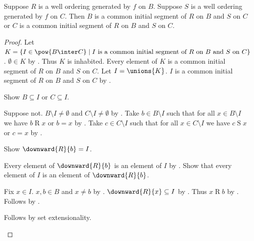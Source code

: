 \begin{lemma}\label{generated_well_orderings_compatible}
    Suppose $R$ is a well ordering generated by $f$ on $B$.
    Suppose $S$ is a well ordering generated by $f$ on $C$.
    Then $B$ is a common initial segment of $R$ on $B$ and $S$ on $C$
    or $C$ is a common initial segment of $R$ on $B$ and $S$ on $C$.
\end{lemma}
\begin{proof}
    Let $K = \{I\in\pow{B\inter C}\mid \text{$I$ is a common initial segment of $R$ on $B$ and $S$ on $C$}\}$.
    $\emptyset\in K$ by .
    Thus $K$ is inhabited.
    Every element of $K$ is a common initial segment of $R$ on $B$ and $S$ on $C$.
    Let $I = \unions{K}$.
    $I$ is a common initial segment of $R$ on $B$ and $S$ on $C$
        by .

    Show $B\subseteq I$ or $C\subseteq I$.
    \begin{subproof}
        Suppose not.
        $B\setminus I\neq\emptyset$ and $C\setminus I\neq\emptyset$
            by .
        Take $b\in B\setminus I$ such that for all $x\in B\setminus I$
            we have $b\mathrel{R}x$ or $b=x$ by .
        Take $c\in C\setminus I$ such that for all $x\in C\setminus I$
            we have $c\mathrel{S}x$ or $c=x$ by .

        Show $\downward{R}{b}=I$.
        \begin{subproof}
            Every element of $\downward{R}{b}$ is an element of $I$
                by .
            Show that every element of $I$ is an element of $\downward{R}{b}$.
            \begin{subproof}
                Fix $x\in I$.
                $x,b\in B$ and $x\neq b$ by .
                $\downward{R}{x}\subseteq I$ by .
                Thus $x\mathrel{R}b$ by .
                Follows by .
            \end{subproof}
            Follows by set extensionality.
        \end{subproof}


\end{subproof}
\end{proof}
